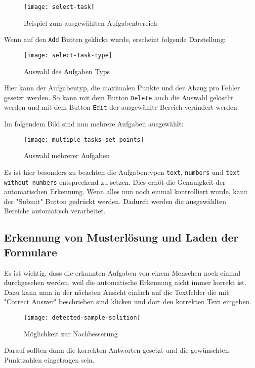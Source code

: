 \begin{figure}[H]
\centering
\texttt{[image: select-task]}
    \caption{Beispiel zum ausgewählten Aufgabenbereich}
\end{figure}

Wenn auf den \texttt{Add} Butten geklickt wurde, erscheint folgende Darstellung:

\begin{figure}[H]
\centering
\texttt{[image: select-task-type]}
    \caption{Auswahl des Aufgaben Typs}
\end{figure}

Hier kann der Aufgabentyp, die maximalen Punkte und der Abzug pro Fehler gesetzt werden.
So kann mit dem Button \texttt{Delete} auch die Auswahl gel\"oscht werden und mit dem Button \texttt{Edit} der ausgew\"ahlte Bereich ver\"andert werden.

Im folgendem Bild sind nun mehrere Aufgaben ausgew\"ahlt:

\begin{figure}[H]
\centering
\texttt{[image: multiple-tasks-set-points]}
    \caption{Auswahl mehrerer Aufgaben}
\end{figure}
Es ist hier besonders zu beachten die Aufgabentypen \texttt{text}, \texttt{numbers} und \texttt{text without numbers} entsprechend zu setzen.
Dies erh\"ot die Genauigkeit der automatischen Erkennung.
Wenn alles nun noch einmal kontrolliert wurde, kann der "Submit" Button gedr\"uckt werden.
Dadurch werden die ausgew\"ahlten Bereiche automatisch verarbeitet.

\subsection{Erkennung von Musterl\"osung und Laden der Formulare}

Es ist wichtig, dass die erkannten Aufgaben von einem Menschen noch einmal durchgesehen werden, weil die automatische Erkennung nicht immer korrekt ist.
Dazu kann man in der n\"achsten Ansicht einfach auf die Textfelder die mit "Correct Answer" beschrieben sind klicken und dort den korrekten Text eingeben.

\begin{figure}[H]
\centering
\texttt{[image: detected-sample-solition]}
    \caption{Möglichkeit zur Nachbesserung}
\end{figure}

Darauf sollten dann die korrekten Antworten gesetzt und die gew\"unschten Punktzahlen eingetragen sein.

